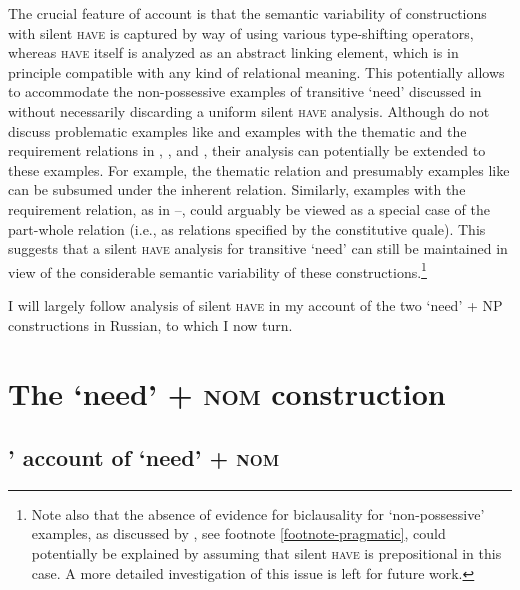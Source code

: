\documentclass[output=paper,colorlinks,citecolor=brown]{langscibook}
\begin{document}
    \largerpage[-1] %

The crucial feature of  account is that the semantic variability of constructions with silent \textsc{have} is captured by way of using various type-shifting operators, whereas \textsc{have} itself is analyzed as an abstract linking element, which is in principle compatible with any kind of relational meaning. This potentially allows to accommodate the non-possessive examples of transitive `need' discussed in  without necessarily discarding a uniform silent \textsc{have} analysis.
Although \citeauthor{Zaroukian.Beller2013} do not discuss problematic examples like  and examples with the thematic and the requirement relations in , , and , their analysis can potentially be extended to these examples. For example, the thematic relation and presumably examples like  can be subsumed under the inherent relation. Similarly, examples with the requirement relation, as in --, could arguably be viewed as a special case of the part-whole relation (i.e., as relations specified by the constitutive quale). This suggests that a silent \textsc{have} analysis for transitive `need' can still be maintained in view of the considerable semantic variability of these constructions.\footnote{Note also that the absence of evidence for biclausality for `non-possessive' examples, as discussed by \citet{Schwarz2006}, see footnote \ref{footnote-pragmatic}, could potentially be explained by assuming that silent \textsc{have} is prepositional in this case. A more detailed investigation of this issue is left for future work.\label{footnote-telic}}

I will largely follow  analysis of silent \textsc{have} in my account of the two `need' + NP constructions in Russian, to which I now turn.

\section{The `need' + \textsc{nom} construction}\label{section-nom}

\subsection{\citeauthor{Harves2008}' account of `need' + \textsc{nom} }\label{section-harves}
\end{document}
